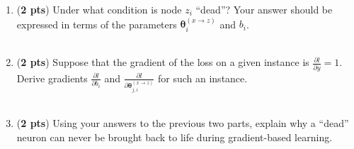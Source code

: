 \documentclass[11pt, letterpaper]{article}
\begin{document}
    \begin{enumerate}
        \item (\textbf{2 pts}) Under what condition is node $z_i$ ``dead''? Your answer should be expressed in terms of the parameters $\mathbf{\theta}_i^{(x \rightarrow z)}$ and $b_i$.\\\\
        
        \item (\textbf{2 pts}) Suppose that the gradient of the loss on a given instance is $\frac{\partial l}{\partial y} = 1$. Derive gradients $\frac{\partial l}{\partial b_i}$ and $\frac{\partial l}{\partial \mathbf{\theta}_{j,i}^{(x \rightarrow z)}}$ for such an instance.\\\\
        
        \item (\textbf{2 pts}) Using your answers to the previous two parts, explain why a ``dead'' neuron can never be brought back to life during gradient-based learning. \\\\
    
    \end{enumerate}
\end{document}
